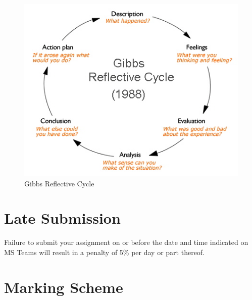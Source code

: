 \begin{figure}[h!]
	\centering
	\includegraphics[width=1.0\linewidth]{img/gibbs-diagram}
	\caption{Gibbs Reflective Cycle}
	\label{fig:gibbs-diagram}
\end{figure}














\section*{Late Submission}
Failure to submit your assignment on or before the date and time indicated on MS Teams will result in a penalty of 5\% per day or part thereof.

\newpage

\section*{Marking Scheme}

